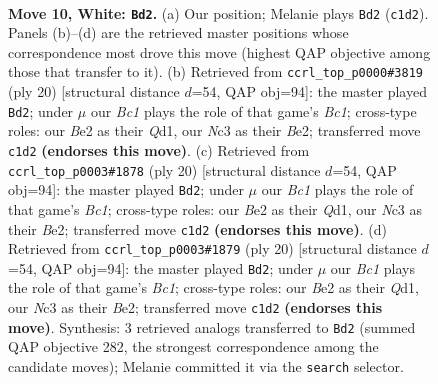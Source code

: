 \documentclass[11pt]{article}
\begin{document}
\clearpage

\begin{figure}[p]\centering
\begin{subfigure}{0.46\textwidth}\centering
\resizebox{\linewidth}{!}{%
\newchessgame
\chessboard[
  setfen={rnbb1rk1/ppq2ppp/4pn2/2Pp4/3P4/2N2N2/PP2BPPP/R1BQ1RK1 w - - 5 10},
  showmover=false,
  pgfstyle=straightmove, color=movearrow, markmove={c1-d2}
]}
\caption{}
\end{subfigure}\hfill
\begin{subfigure}{0.46\textwidth}\centering
\resizebox{\linewidth}{!}{%
\newchessgame
\chessboard[
  setfen={rnb2rk1/2q1ppbp/p4np1/1pP5/8/2N1PN2/PP2BPPP/R1BQ1RK1 w - - 1 11},
  showmover=false,
  pgfstyle=straightmove, color=movearrow, markmove={c1-d2}
]}
\caption{}
\end{subfigure}
\\[4pt]
\begin{subfigure}{0.46\textwidth}\centering
\resizebox{\linewidth}{!}{%
\newchessgame
\chessboard[
  setfen={rnb2rk1/2q1ppbp/p4np1/1pP5/8/2N1PN2/PP2BPPP/R1BQ1RK1 w - - 1 11},
  showmover=false,
  pgfstyle=straightmove, color=movearrow, markmove={c1-d2}
]}
\caption{}
\end{subfigure}\hfill
\begin{subfigure}{0.46\textwidth}\centering
\resizebox{\linewidth}{!}{%
\newchessgame
\chessboard[
  setfen={rnb2rk1/2q1ppbp/p4np1/1pP5/8/2N1PN2/PP2BPPP/R1BQ1RK1 w - - 1 11},
  showmover=false,
  pgfstyle=straightmove, color=movearrow, markmove={c1-d2}
]}
\caption{}
\end{subfigure}
\caption{\textbf{Move 10, White: \texttt{Bd2}.} (a) Our position; Melanie plays \texttt{Bd2} (\texttt{c1d2}). Panels (b)--(d) are the retrieved master positions whose correspondence most drove this move (highest QAP objective among those that transfer to it). (b) Retrieved from \texttt{ccrl\_top\_p0000\#3819} (ply 20) [structural distance $d$=54, QAP obj=94]: the master played \texttt{Bd2}; under $\mu$ our \emph{Bc1} plays the role of that game's \emph{Bc1}; cross-type roles: our \emph{B}e2 as their \emph{Q}d1, our \emph{N}c3 as their \emph{B}e2; transferred move \texttt{c1d2} \textbf{(endorses this move)}. (c) Retrieved from \texttt{ccrl\_top\_p0003\#1878} (ply 20) [structural distance $d$=54, QAP obj=94]: the master played \texttt{Bd2}; under $\mu$ our \emph{Bc1} plays the role of that game's \emph{Bc1}; cross-type roles: our \emph{B}e2 as their \emph{Q}d1, our \emph{N}c3 as their \emph{B}e2; transferred move \texttt{c1d2} \textbf{(endorses this move)}. (d) Retrieved from \texttt{ccrl\_top\_p0003\#1879} (ply 20) [structural distance $d$=54, QAP obj=94]: the master played \texttt{Bd2}; under $\mu$ our \emph{Bc1} plays the role of that game's \emph{Bc1}; cross-type roles: our \emph{B}e2 as their \emph{Q}d1, our \emph{N}c3 as their \emph{B}e2; transferred move \texttt{c1d2} \textbf{(endorses this move)}. Synthesis: 3 retrieved analogs transferred to \texttt{Bd2} (summed QAP objective 282, the strongest correspondence among the candidate moves); Melanie committed it via the \texttt{search} selector.}
\label{fig:thought-m18}
\end{figure}
\end{document}
